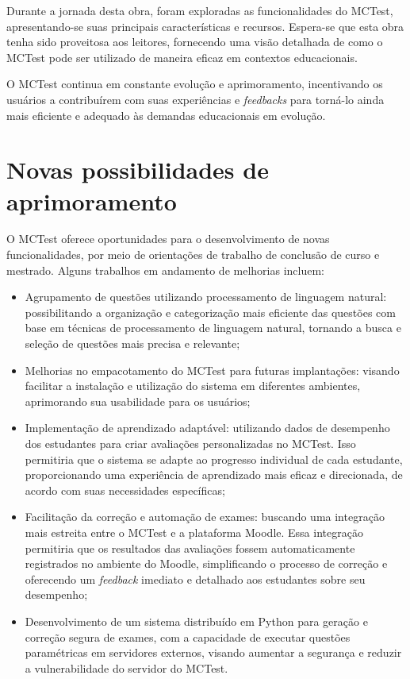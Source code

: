 Durante a jornada desta obra, foram exploradas as funcionalidades do MCTest, apresentando-se suas principais características e recursos. Espera-se que esta obra tenha sido proveitosa aos leitores, fornecendo uma visão detalhada de como o MCTest pode ser utilizado de maneira eficaz em contextos educacionais.

O MCTest continua em constante evolução e aprimoramento, incentivando os usuários a contribuírem com suas experiências e \textit{feedbacks} para torná-lo ainda mais eficiente e adequado às demandas educacionais em evolução. 

\section{Novas possibilidades de aprimoramento}

O MCTest oferece oportunidades para o desenvolvimento de novas funcionalidades, por meio de orientações de trabalho de conclusão de curso e mestrado. Alguns trabalhos em andamento de melhorias incluem:

\begin{itemize}
    \item Agrupamento de questões utilizando processamento de linguagem natural: possibilitando a organização e categorização mais eficiente das questões com base em técnicas de processamento de linguagem natural, tornando a busca e seleção de questões mais precisa e relevante;
    
    \item Melhorias no empacotamento do MCTest para futuras implantações: visando facilitar a instalação e utilização do sistema em diferentes ambientes, aprimorando sua usabilidade para os usuários;
    
    \item Implementação de aprendizado adaptável: utilizando dados de desempenho dos estudantes para criar avaliações personalizadas no MCTest. Isso permitiria que o sistema se adapte ao progresso individual de cada estudante, proporcionando uma experiência de aprendizado mais eficaz e direcionada, de acordo com suas necessidades específicas;
    
    \item Facilitação da correção e automação de exames: buscando uma integração mais estreita entre o MCTest e a plataforma Moodle. Essa integração permitiria que os resultados das avaliações fossem automaticamente registrados no ambiente do Moodle, simplificando o processo de correção e oferecendo um \textit{feedback} imediato e detalhado aos estudantes sobre seu desempenho;

    \item Desenvolvimento de um sistema distribuído em Python para geração e correção segura de exames, com a capacidade de executar questões paramétricas em servidores externos, visando aumentar a segurança e reduzir a vulnerabilidade do servidor do MCTest.
    
\end{itemize}

